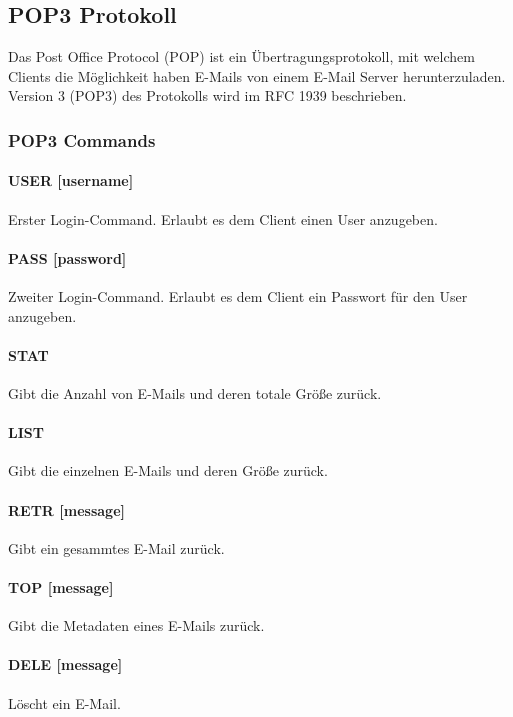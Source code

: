 \documentclass[12pt, letterpaper]{article}
\begin{document}
\subsection{POP3 Protokoll}
Das Post Office Protocol (POP) ist ein Übertragungsprotokoll, mit welchem Clients die Möglichkeit haben E-Mails von einem E-Mail Server herunterzuladen. Version 3 (POP3) des Protokolls wird im RFC 1939\cite{rfc1939} beschrieben. 

\subsubsection{POP3 Commands}

\paragraph{USER [username]}
Erster Login-Command. Erlaubt es dem Client einen User anzugeben.

\paragraph{PASS [password]}
Zweiter Login-Command. Erlaubt es dem Client ein Passwort für den User anzugeben.

\paragraph{STAT}
Gibt die Anzahl von E-Mails und deren totale Größe zurück.

\paragraph{LIST}
Gibt die einzelnen E-Mails und deren Größe zurück.

\paragraph{RETR [message]}
Gibt ein gesammtes E-Mail zurück.

\paragraph{TOP [message]}
Gibt die Metadaten eines E-Mails zurück.

\paragraph{DELE [message]}
Löscht ein E-Mail.
\end{document}
